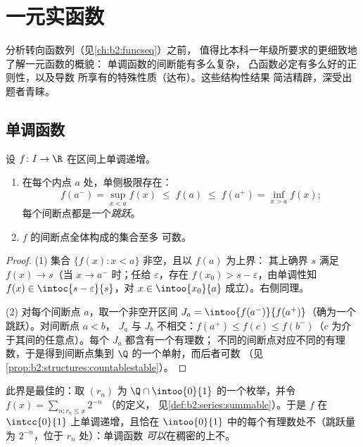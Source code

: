 \chapter{一元实函数}\label{ch:b2:realfun}

分析转向函数列（见\cref{ch:b2:funcseq}）之前，
值得比本科一年级所要求的更细致地了解一元函数的概貌：
单调函数的间断能有多么复杂，
凸函数必定有多么好的正则性，以及导数
所享有的特殊性质（达布）。这些结构性结果
简洁精辟，深受出题者青睐。

\section{单调函数}

\begin{theorem}[单调函数的正则性]\label{thm:b2:realfun:monotone}
设 $f \colon I \to \R$ 在区间上单调递增。
\begin{enumerate}
  \item 在每个内点 $a$ 处，单侧极限存在：
        \[
        f(a^-) = \sup_{x < a} f(x) \;\leq\; f(a) \;\leq\;
        f(a^+) = \inf_{x > a} f(x) ;
        \]
        每个间断点都是一个\emph{跳跃}。
  \item $f$ 的间断点全体构成的集合至多
        可数。
\end{enumerate}
\end{theorem}

\begin{proof}
(1) 集合 $\{f(x) : x < a\}$ 非空，且以 $f(a)$ 为上界：
其上确界 $s$ 满足 $f(x) \to s$（当 $x \to a^-$ 时；任给
$\varepsilon$，存在 $f(x_0) > s - \varepsilon$，由单调性知
$f(x) \in \intoc{s - \varepsilon}{s}$，对 $x \in
\intoo{x_0}{a}$ 成立）。右侧同理。

(2) 对每个间断点 $a$，取一个非空开区间
$J_a = \intoo{f(a^-)}{f(a^+)}$（确为一个跳跃）。对间断点 $a < b$，
$J_a$ 与 $J_b$ 不相交：$f(a^+) \leq f(c)
\leq f(b^-)$（$c$ 为介于其间的任意点）。每个 $J_a$ 都含有一个有理数；
不同的间断点对应不同的有理数，于是得到间断点集到
$\Q$ 的一个单射，而后者可数
（见\cref{prop:b2:structures:countablestable}）。
\end{proof}

\begin{example}
此界是最佳的：取 $(r_n)$ 为 $\Q \cap
\intoo{0}{1}$ 的一个枚举，并令 $f(x) = \sum_{n : r_n \leq x} 2^{-n}$
（的定义，
见\cref{def:b2:series:summable}）。于是 $f$ 在
$\intcc{0}{1}$ 上单调递增，且恰在
$\intoo{0}{1}$ 中的每个有理数处不（跳跃量为 $2^{-n}$，位于 $r_n$ 处）：单调函数
\emph{可以}在稠密的上不。
\end{example}

